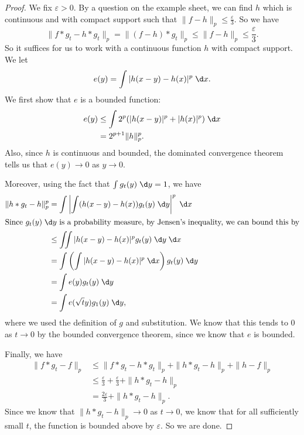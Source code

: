 \documentclass[a4paper]{article}
\begin{document}
\begin{proof}
  We fix $\varepsilon > 0$. By a question on the example sheet, we can find $h$ which is continuous and with compact support such that $\|f - h\|_p \leq \frac{\varepsilon}{3}$. So we have
  \[
    \|f * g_t - h * g_t\|_p = \|(f - h) * g_t\|_p \leq \|f - h\|_p \leq \frac{\varepsilon}{3}.
  \]
  So it suffices for us to work with a continuous function $h$ with compact support. We let
  \[
    e(y) = \int |h(x - y) - h(x)|^p \;\d x.
  \]
  We first show that $e$ is a bounded function:
  \begin{align*}
    e(y) &\leq \int 2^p(|h(x - y)|^p + |h(x)|^p)\;\d x\\
    &= 2^{p + 1} \|h\|_p^p.
  \end{align*}
  Also, since $h$ is continuous and bounded, the dominated convergence theorem tells us that $e(y) \to 0$ as $y \to 0$.

  Moreover, using the fact that $\int g_t(y) \;\d y = 1$, we have
  \begin{align*}
    \|h*g_t - h\|_p^p &= \int \left|\int (h(x - y) - h(x))g_t(y) \;\d y\right|^p \;\d x\\
    \intertext{Since $g_t(y) \;\d y$ is a probability measure, by Jensen's inequality, we can bound this by}
    &\leq \iint |h(x - y) - h(x)|^p g_t(y) \;\d y \;\d x\\
    &= \int \left(\int |h(x - y) - h(x)|^p \;\d x\right) g_t(y) \;\d y\\
    &= \int e(y) g_t(y) \;\d y\\
    &= \int e(\sqrt{t} y) g_1(y)\;\d y,
  \end{align*}
  where we used the definition of $g$ and substitution. We know that this tends to $0$ as $t \to 0$ by the bounded convergence theorem, since we know that $e$ is bounded.

  Finally, we have
  \begin{align*}
    \|f * g_t - f\|_p &\leq \|f * g_t - h * g_t\|_p + \|h*g_t - h\|_p + \|h - f\|_p\\
    &\leq \frac{\varepsilon}{3} + \frac{\varepsilon}{3} + \|h*g_t - h\|_p\\
    &= \frac{2\varepsilon}{3} + \|h*g_t - h\|_p.
  \end{align*}
  Since we know that $\|h*g_t - h\|_p \to 0$ as $t \to 0$, we know that for all sufficiently small $t$, the function is bounded above by $\varepsilon$. So we are done.
\end{proof}
\end{document}
